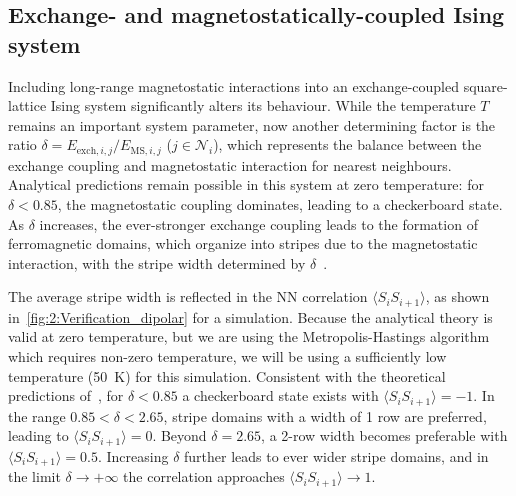 \subsection{Exchange- and magnetostatically-coupled Ising system}
Including long-range magnetostatic interactions into an exchange-coupled square-lattice Ising system significantly alters its behaviour.
While the temperature $T$ remains an important system parameter, now another determining factor is the ratio $\delta = E_{\mathrm{exch},i,j}/E_{\mathrm{MS},i,j}$ ($j \in \mathcal{N}_i$), which represents the balance between the exchange coupling and magnetostatic interaction for nearest neighbours.
Analytical predictions remain possible in this system at zero temperature: for $\delta < 0.85$, the magnetostatic coupling dominates, leading to a checkerboard state.
As $\delta$ increases, the ever-stronger exchange coupling leads to the formation of ferromagnetic domains, which organize into stripes due to the magnetostatic interaction, with the stripe width determined by $\delta$~\cite{StripedDipolarIsing}.


The average stripe width is reflected in the NN correlation $\langle S_i S_{i+1} \rangle$, as shown in~\cref{fig:2:Verification_dipolar} for a \hotspice simulation.
Because the analytical theory is valid at zero temperature, but we are using the Metropolis-Hastings algorithm which requires non-zero temperature, we will be using a sufficiently low temperature (\SI{50}{\kelvin}) for this simulation.
Consistent with the theoretical predictions of~, for $\delta < 0.85$ a checkerboard state exists with $\langle S_i S_{i+1} \rangle = -1$.
In the range $0.85 < \delta < 2.65$, stripe domains with a width of 1 row are preferred, leading to $\langle S_i S_{i+1} \rangle = 0$.
Beyond $\delta=2.65$, a 2-row width becomes preferable with $\langle S_i S_{i+1} \rangle = 0.5$.
Increasing $\delta$ further leads to ever wider stripe domains, and in the limit $\delta \rightarrow +\infty$ the correlation approaches $\langle S_i S_{i+1} \rangle \rightarrow 1$.

